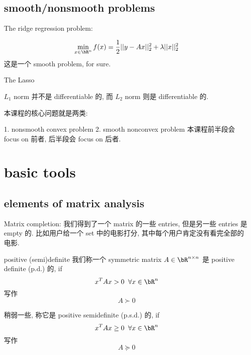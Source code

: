 \documentclass[lang=cn,11pt]{elegantbook}
\begin{document}
\section{smooth/nonsmooth problems}

The ridge regression problem:

\[
\min_{x\in \bR^n} f(x) = \frac{1}{2} ||y - Ax||_2^2 + \lambda ||x||_2^2
\]
这是一个 smooth problem, for sure. 

The Lasso 


$L_1$ norm 并不是 differentiable 的, 而 $L_2$ norm 则是 differentiable 的.     



本课程的核心问题就是两类:

1. nonsmooth convex problem
2. smooth nonconvex problem
本课程前半段会 focus on 前者, 后半段会 focus on 后者.











\chapter{basic tools}
\section{elements of matrix analysis}

\begin{example}
Matrix completion: 我们得到了一个 matrix 的一些 entries, 但是另一些 entries 是 empty 的. 比如用户给一个 set 中的电影打分, 其中每个用户肯定没有看完全部的电影.



\begin{definition}{positive (semi)definite}
我们称一个 symmetric matrix $A \in \bR^{n\times n}$ 是 positive definite (p.d.) 的, if 
$$x^T Ax >0   \;\; \forall x\in \bR^n$$  写作 $$
A \succ 0 
$$

稍弱一些, 称它是 positive semidefinite (p.s.d.) 的, if
$$
x^T A x \geq 0 \;\; \forall x\in\bR^n
$$写作 
$$
A \succeq 0
$$

\end{definition}

\end{example}
\end{document}
